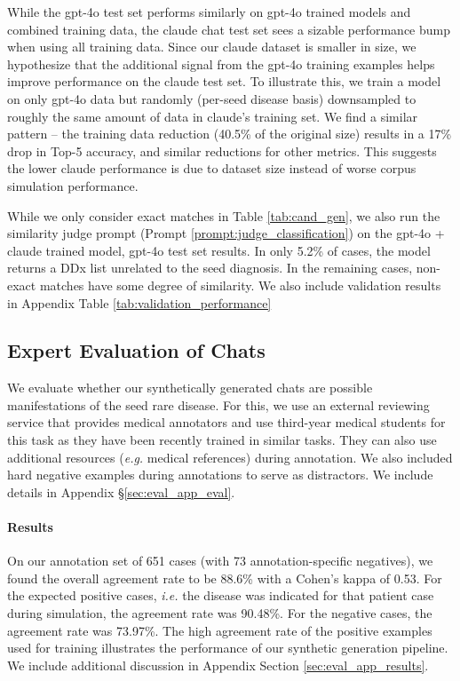 While the gpt-4o test set performs similarly on gpt-4o trained models and combined training data, the claude chat test set sees a sizable performance bump when using all training data.   Since our claude dataset is smaller in size, we hypothesize that the additional signal from the gpt-4o training examples helps improve performance on the claude test set.  To illustrate this, we train a model on only gpt-4o data but randomly (per-seed disease basis) downsampled to roughly the same amount of data in claude's training set.  We find a similar pattern -- the training data reduction (40.5\% of the original size) results in a 17\% drop in Top-5 accuracy, and similar reductions for other metrics.  This suggests the lower claude performance is due to dataset size instead of worse corpus simulation performance.

While we only consider exact matches in Table \ref{tab:cand_gen}, we also run the similarity judge prompt (Prompt \ref{prompt:judge_classification}) on the gpt-4o + claude trained model, gpt-4o test set results. In only 5.2\% of cases, the model returns a DDx list unrelated to the seed diagnosis.  In the remaining cases, non-exact matches have some degree of similarity. We also include validation results in Appendix Table \ref{tab:validation_performance}
 



\subsection{Expert Evaluation of Chats}\label{sec:eval_exp}
We evaluate whether our synthetically generated chats are possible manifestations of the seed rare disease. For this, we use an external reviewing service that provides medical annotators and use third-year medical students for this task as they have been recently trained in similar tasks. They can also use additional resources (\textit{e.g.} medical references) during annotation. We also included hard negative examples during annotations to serve as distractors. We include details in Appendix \S \ref{sec:eval_app_eval}.


\paragraph{Results}
On our annotation set of 651 cases (with 73 annotation-specific negatives), we found the overall agreement rate to be 88.6\% with a Cohen's kappa of 0.53.  For the expected positive cases, \textit{i.e.} the disease was indicated for that patient case during simulation, the agreement rate was 90.48\%.  For the negative cases, the agreement rate was 73.97\%.  The high agreement rate of the positive examples used for training illustrates the performance of our synthetic generation pipeline. We include additional discussion in Appendix Section \ref{sec:eval_app_results}.

